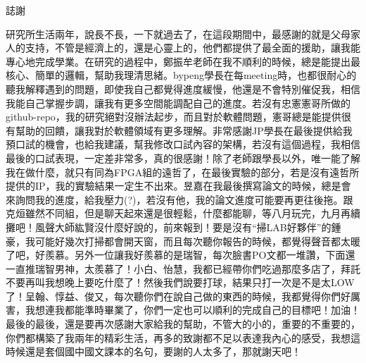 
\begin{center}
\large{誌謝}
\end{center}
研究所生活兩年，說長不長，一下就過去了，在這段期間中，最感謝的就是父母家人的支持，不管是經濟上的，還是心靈上的，他們都提供了最全面的援助，讓我能專心地完成學業。在研究的過程中，鄭振牟老師在我不順利的時候，總是能提出最核心、簡單的邏輯，幫助我理清思緒。bypeng學長在每meeting時，也都很耐心的聽我解釋遇到的問題，即使我自己都覺得進度緩慢，他還是不會特別催促我，相信我能自己掌握步調，讓我有更多空間能調配自己的進度。若沒有忠憲憲哥所做的github-repo，我的研究絕對沒辦法起步，而且對於軟體問題，憲哥總是能提供很有幫助的回饋，讓我對於軟體領域有更多理解。非常感謝JP學長在最後提供給我預口試的機會，也給我建議，幫我修改口試內容的架構，若沒有這個過程，我相信最後的口試表現，一定差非常多，真的很感謝！除了老師跟學長以外，唯一能了解我在做什麼，就只有同為FPGA組的遠哲了，在最後實驗的部分，若是沒有遠哲所提供的IP，我的實驗結果一定生不出來。昱嘉在我最後撰寫論文的時候，總是會來詢問我的進度，給我壓力(?)，若沒有他，我的論文進度可能要再更往後拖。跟克烜雖然不同組，但是聊天起來還是很輕鬆，什麼都能聊，等八月玩完，九月再續攤吧！風聲大師紘賢沒什麼好說的，前來報到！要是沒有“掃LAB好夥伴”的鍾豪，我可能好幾次打掃都會開天窗，而且每次聽你報告的時候，都覺得聲音都太暖了吧，好羨慕。另外一位讓我好羨慕的是瑞智，每次臉書PO文都一堆讚，下面還一直推瑞智男神，太羨慕了！小白、怡慧，我都已經帶你們吃過那麼多店了，拜託不要再叫我想晚上要吃什麼了！然後我們說要打球，結果只打一次是不是太LOW了！呈翰、惇益、俊又，每次聽你們在說自己做的東西的時候，我都覺得你們好厲害，我想連我都能準時畢業了，你們一定也可以順利的完成自己的目標吧！加油！最後的最後，還是要再次感謝大家給我的幫助，不管大的小的，重要的不重要的，你們都構築了我兩年的精彩生活，再多的致謝都不足以表達我內心的感受，我想這時候還是套個國中國文課本的名句，要謝的人太多了，那就謝天吧！




